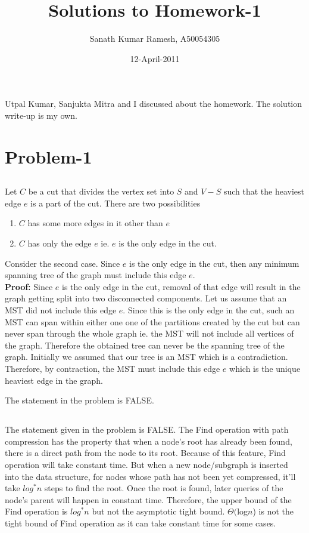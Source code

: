 \documentclass{article}
\begin{document}
\title{Solutions to Homework-1}
\author{Sanath Kumar Ramesh, A50054305}
\date{12-April-2011}
\maketitle

Utpal Kumar, Sanjukta Mitra and I discussed about the homework. The solution write-up is my own.

\section{Problem-1}
\subsection{}
	Let $C$ be a cut that divides the vertex set into $S$ and $V-S$ such that the heaviest edge $e$ is a part of the cut. There are two possibilities
	\begin{enumerate}
		\item $C$ has some more edges in it other than $e$ 
		\item $C$ has only the edge $e$ ie. $e$ is the only edge in the cut. 
	\end{enumerate}
	Consider the second case. Since $e$ is the only edge in the cut, then any minimum spanning tree of the graph must include this edge $e$.\\
	\textbf{Proof:} Since $e$ is the only edge in the cut, removal of that edge will result in the graph getting split into two disconnected components. Let us assume that an MST did not include this edge $e$. Since this is the only edge in the cut, such an MST can span within either one one of the partitions created by the cut but can never span through the whole graph ie. the MST will not include all vertices of the graph. Therefore the obtained tree can never be the spanning tree of the graph. Initially we assumed that our tree is an MST which is a contradiction. Therefore, by contraction, the MST must include this edge $e$ which is the unique heaviest edge in the graph. 

	The statement in the problem is FALSE.

\subsection{}
The statement given in the problem is FALSE. The Find operation with path compression has the property that when a node's root has already been found, there is a direct path from the node to its root. Because of this feature, Find operation will take constant time. But when a new node/subgraph is inserted into the data structure, for nodes whose path has not been yet compressed, it'll take $log^{*}n$ steps to find the root. Once the root is found, later queries of the node's parent will happen in constant time. Therefore, the upper bound of the Find operation is $log^{*}n$ but not the asymptotic tight bound. $\Theta($log$n$) is not the tight bound of Find operation as it can take constant time for some cases.
	
\end{document}
